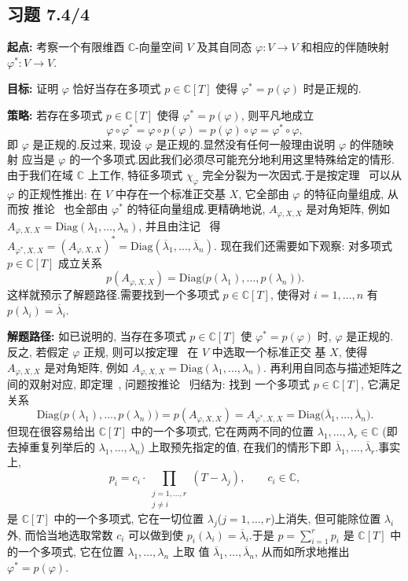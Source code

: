 \subsection*{习题 7.4/4}

\noindent\textbf{起点:} 考察一个有限维酉 $\mathbb{C}$-向量空间 $V$ 及其自同态
$\varphi \colon V \longrightarrow V$ 和相应的伴随映射 $\varphi^* \colon V \longrightarrow V$.

\noindent\textbf{目标:} 证明 $\varphi$ 恰好当存在多项式 $p \in \mathbb{C}[T]$ 使得
$\varphi^* = p(\varphi)$ 时是正规的.

\noindent\textbf{策略:} 若存在多项式 $p \in \mathbb{C}[T]$ 使得 $\varphi^* = p(\varphi)$, 则平凡地成立
\[
\varphi \circ \varphi^* = \varphi \circ p(\varphi) = p(\varphi) \circ \varphi = \varphi^* \circ \varphi,
\]
即 $\varphi$ 是正规的.反过来, 现设 $\varphi$ 是正规的.显然没有任何一般理由说明 $\varphi$ 的伴随映射
应当是 $\varphi$ 的一个多项式.因此我们必须尽可能充分地利用这里特殊给定的情形.由于我们在域
$\mathbb{C}$ 上工作, 特征多项式 $\chi_\varphi$ 完全分裂为一次因式.于是按定理~ 可以从
$\varphi$ 的正规性推出: 在 $V$ 中存在一个标准正交基 $X$, 它全部由 $\varphi$ 的特征向量组成, 从而按
推论~ 也全部由 $\varphi^*$ 的特征向量组成.更精确地说,
$A_{\varphi, X, X}$ 是对角矩阵, 例如 $A_{\varphi, X, X} = \mathrm{Diag}(\lambda_1, \ldots, \lambda_n)$,
并且由注记~ 得
$A_{\varphi^*, X, X} = (A_{\varphi, X, X})^* = \mathrm{Diag}(\overline{\lambda}_1, \ldots, \overline{\lambda}_n)$.
现在我们还需要如下观察: 对多项式 $p \in \mathbb{C}[T]$ 成立关系
\[
p(A_{\varphi, X, X}) = \mathrm{Diag}\bigl(p(\lambda_1), \ldots, p(\lambda_n)\bigr)\text{.}
\]
这样就预示了解题路径.需要找到一个多项式 $p \in \mathbb{C}[T]$, 使得对 $i = 1, \ldots, n$ 有
$p(\lambda_i) = \overline{\lambda}_i$.

\noindent\textbf{解题路径:} 如已说明的, 当存在多项式 $p \in \mathbb{C}[T]$ 使 $\varphi^* = p(\varphi)$ 时,
$\varphi$ 是正规的.反之, 若假定 $\varphi$ 正规, 则可以按定理~ 在 $V$ 中选取一个标准正交
基 $X$, 使得 $A_{\varphi, X, X}$ 是对角矩阵, 例如 $A_{\varphi, X, X} = \mathrm{Diag}(\lambda_1, \ldots, \lambda_n)$.
再利用自同态与描述矩阵之间的双射对应, 即定理~, 问题按推论~ 归结为: 找到
一个多项式 $p \in \mathbb{C}[T]$, 它满足关系
\[
\mathrm{Diag}\bigl(p(\lambda_1), \ldots, p(\lambda_n)\bigr) = p(A_{\varphi, X, X}) = A_{\varphi^*, X, X} = \mathrm{Diag}\bigl(\overline{\lambda}_1, \ldots, \overline{\lambda}_n\bigr)\text{.}
\]
但现在很容易给出 $\mathbb{C}[T]$ 中的一个多项式, 它在两两不同的位置 $\lambda_1, \ldots, \lambda_r \in \mathbb{C}$
(即去掉重复列举后的 $\lambda_1, \ldots, \lambda_n$) 上取预先指定的值, 在我们的情形下即
$\overline{\lambda}_1, \ldots, \overline{\lambda}_r$.事实上,
\[
p_i = c_i \cdot \prod_{\substack{j = 1, \ldots, r \\ j \neq i}} (T - \lambda_j), \qquad c_i \in \mathbb{C},
\]
是 $\mathbb{C}[T]$ 中的一个多项式, 它在一切位置 $\lambda_j$($j = 1, \ldots, r$)上消失, 但可能除位置
$\lambda_i$ 外, 而恰当地选取常数 $c_i$ 可以做到使 $p_i(\lambda_i) = \overline{\lambda}_i$.于是
$p = \sum_{i = 1}^{r} p_i$ 是 $\mathbb{C}[T]$ 中的一个多项式, 它在位置 $\lambda_1, \ldots, \lambda_n$ 上取
值 $\overline{\lambda}_1, \ldots, \overline{\lambda}_n$, 从而如所求地推出 $\varphi^* = p(\varphi)$.

